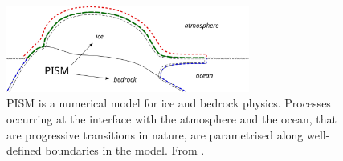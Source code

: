 \documentclass[a4paper]{kappa}
\begin{document}
\begin{figure}
  \includegraphics[width=80mm]{model-interfaces}
  \caption{PISM is a numerical model for ice and bedrock physics. Processes
           occurring at the interface with the atmosphere and the ocean, that
           are progressive transitions in nature, are parametrised along
           well-defined boundaries in the model.
           From \citet{PISM-authors.2014}.}
  \label{fig:model-interfaces}
\end{figure}
\end{document}
